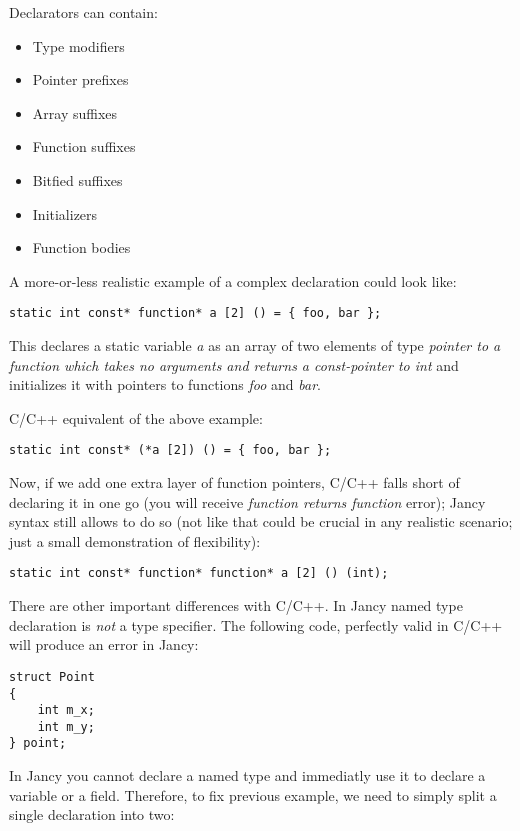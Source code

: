 \documentclass[oneside]{book}
\begin{document}
Declarators can contain:
\begin{itemize}
\item Type modifiers
\item Pointer prefixes
\item Array suffixes
\item Function suffixes
\item Bitfied suffixes
\item Initializers
\item Function bodies
\end{itemize}

A more-or-less realistic example of a complex declaration could look like:

\begin{lstlisting}
static int const* function* a [2] () = { foo, bar };
\end{lstlisting}

This declares a static variable \emph{a} as an array of two elements of type \emph{pointer to a function which takes no arguments and returns a const-pointer to int} and initializes it with pointers to functions \emph{foo} and \emph{bar}.

C/C++ equivalent of the above example:

\begin{lstlisting}
static int const* (*a [2]) () = { foo, bar };
\end{lstlisting}

Now, if we add one extra layer of function pointers, C/C++ falls short of declaring it in one go (you will receive \emph{function returns function} error); Jancy syntax still allows to do so (not like that could be crucial in any realistic scenario; just a small demonstration of flexibility):

\begin{lstlisting}
static int const* function* function* a [2] () (int);
\end{lstlisting}

There are other important differences with C/C++. In Jancy named type declaration is \emph{not} a type specifier. The following code, perfectly valid in C/C++ will produce an error in Jancy:

\begin{lstlisting}
struct Point
{
	int m_x;
	int m_y;
} point;
\end{lstlisting}

In Jancy you cannot declare a named type and immediatly use it to declare a variable or a field. Therefore, to fix previous example, we need to simply split a single declaration into two:
\end{document}
